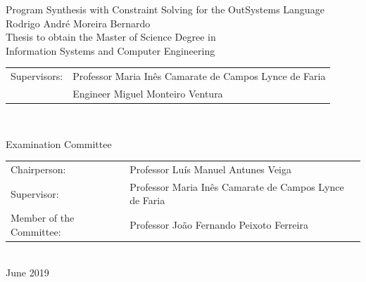 \begin{center}

\vspace{2.5cm}

\vspace{1.0cm}
{\FontLb Program Synthesis with Constraint Solving for the OutSystems Language} \\
\vspace{2.7cm}
{\FontMb Rodrigo André Moreira Bernardo} \\
\vspace{2.0cm}
{\FontSn Thesis to obtain the Master of Science Degree in} \\
\vspace{0.3cm}
{\FontLb Information Systems and Computer Engineering} \\
\vspace{1.1cm}
{\FontSn %
\begin{tabular}{ll}
	Supervisors: & Professor Maria Inês Camarate de Campos Lynce de Faria \\
	             & Engineer Miguel Monteiro Ventura \\
\end{tabular} } \\

\vspace{1.1cm}

{\FontMb Examination Committee} \\

\vspace{0.3cm}

{\FontSn %
\begin{tabular}{ll}
Chairperson: & Professor Luís Manuel Antunes Veiga \\
Supervisor: & Professor Maria Inês Camarate de Campos Lynce de Faria \\
Member of the Committee: & Professor João Fernando Peixoto Ferreira \\
\end{tabular} } \\

\vspace{1.5cm}
{\FontMb June 2019} \\
%
\end{center}

\cleardoublepage

